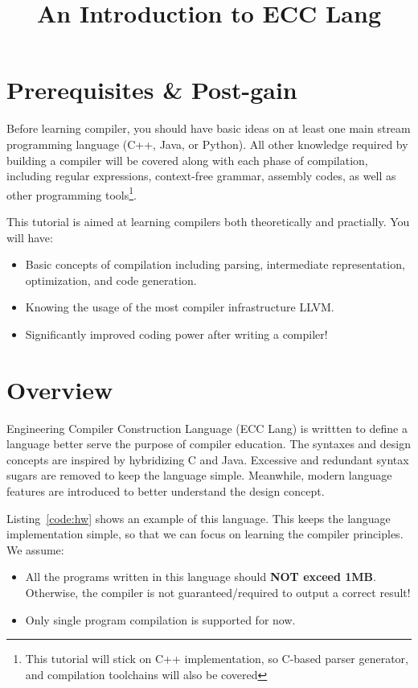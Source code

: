 \documentclass{article}
\title{An Introduction to ECC Lang}
\date{}
\begin{document}
\maketitle

\section{Prerequisites \& Post-gain}

Before learning compiler, you should have basic ideas on at least
one main stream programming language (C++, Java, or Python).
All other knowledge required by building a compiler will
be covered along with each phase of compilation, including
regular expressions, context-free grammar, assembly codes,
as well as other programming tools\footnote{This tutorial
will stick on C++ implementation, so C-based parser generator,
and compilation toolchains will also be covered}.

\noindent This tutorial is aimed at learning compilers
both theoretically and practially. You will have:
\begin{itemize}
  \item Basic concepts of compilation including parsing, intermediate representation,
    optimization, and code generation.
  \item Knowing the usage of the most compiler infrastructure LLVM.
  \item Significantly improved coding power after writing a compiler!
\end{itemize}

\section{Overview}

\noindent Engineering Compiler Construction Language (ECC Lang)
is writtten to define a language better serve the purpose of compiler education.
The syntaxes and design concepts are inspired by hybridizing C and Java.
Excessive and redundant syntax sugars are removed to keep
the language simple. Meanwhile, modern language features
are introduced to better understand the design concept.

\noindent Listing~\ref{code:hw} shows an example of this language.
This keeps the language implementation simple, so that we can focus on
learning the compiler principles.
We assume:
\begin{itemize}
  \item All the programs written in this language should \textbf{NOT exceed 1MB}.
    Otherwise, the compiler is not guaranteed/required to output a correct result!
  \item Only single program compilation is supported for now.
\end{itemize}
\end{document}
